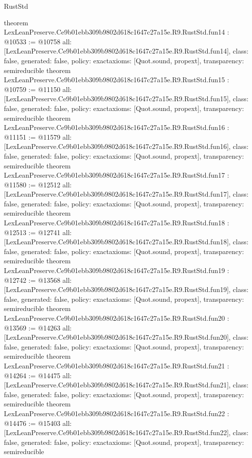 \begin{lexlean}{RustStd}
\begin{coremodule}
{}
theorem LexLeanPreserve.Ce9b01ebb309b9802d618c1647c27a15e.R9.RustStd.fun14 : @10533 := @10758 {
  all: [LexLeanPreserve.Ce9b01ebb309b9802d618c1647c27a15e.R9.RustStd.fun14],
  class: false,
  generated: false,
  policy: exact{axioms: [Quot.sound, propext]},
  transparency: semireducible
}
theorem LexLeanPreserve.Ce9b01ebb309b9802d618c1647c27a15e.R9.RustStd.fun15 : @10759 := @11150 {
  all: [LexLeanPreserve.Ce9b01ebb309b9802d618c1647c27a15e.R9.RustStd.fun15],
  class: false,
  generated: false,
  policy: exact{axioms: [Quot.sound, propext]},
  transparency: semireducible
}
theorem LexLeanPreserve.Ce9b01ebb309b9802d618c1647c27a15e.R9.RustStd.fun16 : @11151 := @11579 {
  all: [LexLeanPreserve.Ce9b01ebb309b9802d618c1647c27a15e.R9.RustStd.fun16],
  class: false,
  generated: false,
  policy: exact{axioms: [Quot.sound, propext]},
  transparency: semireducible
}
theorem LexLeanPreserve.Ce9b01ebb309b9802d618c1647c27a15e.R9.RustStd.fun17 : @11580 := @12512 {
  all: [LexLeanPreserve.Ce9b01ebb309b9802d618c1647c27a15e.R9.RustStd.fun17],
  class: false,
  generated: false,
  policy: exact{axioms: [Quot.sound, propext]},
  transparency: semireducible
}
theorem LexLeanPreserve.Ce9b01ebb309b9802d618c1647c27a15e.R9.RustStd.fun18 : @12513 := @12741 {
  all: [LexLeanPreserve.Ce9b01ebb309b9802d618c1647c27a15e.R9.RustStd.fun18],
  class: false,
  generated: false,
  policy: exact{axioms: [Quot.sound, propext]},
  transparency: semireducible
}
theorem LexLeanPreserve.Ce9b01ebb309b9802d618c1647c27a15e.R9.RustStd.fun19 : @12742 := @13568 {
  all: [LexLeanPreserve.Ce9b01ebb309b9802d618c1647c27a15e.R9.RustStd.fun19],
  class: false,
  generated: false,
  policy: exact{axioms: [Quot.sound, propext]},
  transparency: semireducible
}
theorem LexLeanPreserve.Ce9b01ebb309b9802d618c1647c27a15e.R9.RustStd.fun20 : @13569 := @14263 {
  all: [LexLeanPreserve.Ce9b01ebb309b9802d618c1647c27a15e.R9.RustStd.fun20],
  class: false,
  generated: false,
  policy: exact{axioms: [Quot.sound, propext]},
  transparency: semireducible
}
theorem LexLeanPreserve.Ce9b01ebb309b9802d618c1647c27a15e.R9.RustStd.fun21 : @14264 := @14475 {
  all: [LexLeanPreserve.Ce9b01ebb309b9802d618c1647c27a15e.R9.RustStd.fun21],
  class: false,
  generated: false,
  policy: exact{axioms: [Quot.sound, propext]},
  transparency: semireducible
}
theorem LexLeanPreserve.Ce9b01ebb309b9802d618c1647c27a15e.R9.RustStd.fun22 : @14476 := @15403 {
  all: [LexLeanPreserve.Ce9b01ebb309b9802d618c1647c27a15e.R9.RustStd.fun22],
  class: false,
  generated: false,
  policy: exact{axioms: [Quot.sound, propext]},
  transparency: semireducible
}
\end{coremodule}
\end{lexlean}

